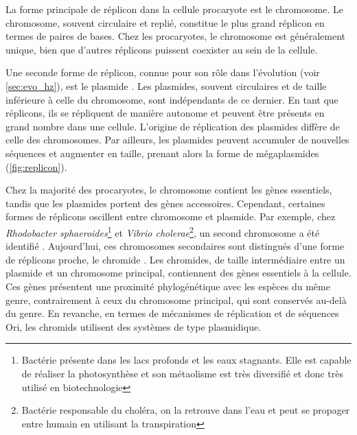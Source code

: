 La forme principale de réplicon dans la cellule procaryote est le chromosome. Le chromosome, souvent circulaire et replié, constitue le plus grand réplicon en termes de paires de bases. Chez les procaryotes, le chromosome est généralement unique, bien que d'autres réplicons puissent coexister au sein de la cellule.

Une seconde forme de réplicon, connue pour son rôle dans l’évolution (voir \autoref{sec:evo_hz}), est le plasmide \cite{lederberg_gene_1946,lederberg_sex_1953}. Les plasmides, souvent circulaires et de taille inférieure à celle du chromosome, sont indépendants de ce dernier. En tant que réplicons, ils se répliquent de manière autonome et peuvent être présents en grand nombre dans une cellule. L’origine de réplication des plasmides diffère de celle des chromosomes. Par ailleurs, les plasmides peuvent accumuler de nouvelles séquences et augmenter en taille, prenant alors la forme de mégaplasmides (\autoref{fig:replicon}).

Chez la majorité des procaryotes, le chromosome contient les gènes essentiels, tandis que les plasmides portent des gènes accessoires. Cependant, certaines formes de réplicons oscillent entre chromosome et plasmide. Par exemple, chez \textit{Rhodobacter sphaeroides}\footnote{Bactérie présente dans les lacs profonds et les eaux stagnants. Elle est capable de réaliser la photosynthèse et son métaolisme est très diversifié et donc très utilisé en biotechnologie} et \textit{Vibrio cholerae}\footnote{Bactérie responsable du choléra, on la retrouve dans l'eau et peut se propager entre humain en utilisant la transpiration}, un second chromosome a été identifié \cite{suwanto_physical_1989,trucksis_vibrio_1998}. Aujourd'hui, ces chromosomes secondaires sont distingués d'une forme de réplicons proche, le chromide \cite{harrison_introducing_2010}. Les chromides, de taille intermédiaire entre un plasmide et un chromosome principal, contiennent des gènes essentiels à la cellule. Ces gènes présentent une proximité phylogénétique avec les espèces du même genre, contrairement à ceux du chromosome principal, qui sont conservés au-delà du genre. En revanche, en termes de mécanismes de réplication et de séquences Ori, les chromids utilisent des systèmes de type plasmidique.

